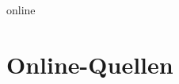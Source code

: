 \documentclass[11pt,a4paper]{article}
\begin{document}
%
\begin{btSect}{online}
\section*{Online-Quellen}
\btPrintCited
\end{btSect}
\end{document}
